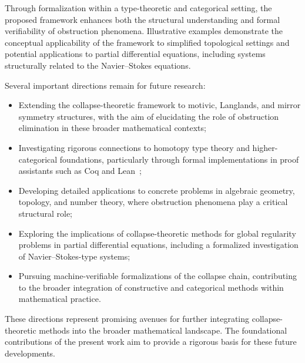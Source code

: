 \documentclass[11pt]{article}
\begin{document}
Through formalization within a type-theoretic and categorical setting, the proposed framework enhances both the structural understanding and formal verifiability of obstruction phenomena. Illustrative examples demonstrate the conceptual applicability of the framework to simplified topological settings and potential applications to partial differential equations, including systems structurally related to the Navier–Stokes equations.

Several important directions remain for future research:

\begin{itemize}
    \item Extending the collapse-theoretic framework to motivic, Langlands, and mirror symmetry structures, with the aim of elucidating the role of obstruction elimination in these broader mathematical contexts;
    \item Investigating rigorous connections to homotopy type theory and higher-categorical foundations, particularly through formal implementations in proof assistants such as Coq and Lean~\cite{HOTT2013,CoqManual2017};
    \item Developing detailed applications to concrete problems in algebraic geometry, topology, and number theory, where obstruction phenomena play a critical structural role;
    \item Exploring the implications of collapse-theoretic methods for global regularity problems in partial differential equations, including a formalized investigation of Navier–Stokes-type systems;
    \item Pursuing machine-verifiable formalizations of the collapse chain, contributing to the broader integration of constructive and categorical methods within mathematical practice.
\end{itemize}

These directions represent promising avenues for further integrating collapse-theoretic methods into the broader mathematical landscape. The foundational contributions of the present work aim to provide a rigorous basis for these future developments.
\end{document}
